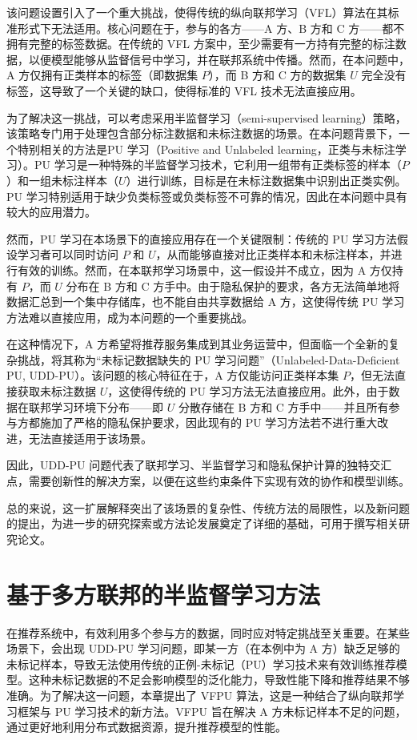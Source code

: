 该问题设置引入了一个重大挑战，使得传统的纵向联邦学习（VFL）算法在其标准形式下无法适用。核心问题在于，参与的各方——A 方、B 方和 C 方——都不拥有完整的标签数据。在传统的 VFL 方案中，至少需要有一方持有完整的标注数据，以便模型能够从监督信号中学习，并在联邦系统中传播。然而，在本问题中，A 方仅拥有正类样本的标签（即数据集 $ P $），而 B 方和 C 方的数据集 $ U $ 完全没有标签，这导致了一个关键的缺口，使得标准的 VFL 技术无法直接应用。

为了解决这一挑战，可以考虑采用半监督学习（semi-supervised learning）策略，该策略专门用于处理包含部分标注数据和未标注数据的场景。在本问题背景下，一个特别相关的方法是PU 学习（Positive and Unlabeled learning，正类与未标注学习）。PU 学习是一种特殊的半监督学习技术，它利用一组带有正类标签的样本（$ P $）和一组未标注样本（$ U $）进行训练，目标是在未标注数据集中识别出正类实例。PU 学习特别适用于缺少负类标签或负类标签不可靠的情况，因此在本问题中具有较大的应用潜力。

然而，PU 学习在本场景下的直接应用存在一个关键限制：传统的 PU 学习方法假设学习者可以同时访问 $ P $ 和 $ U $，从而能够直接对比正类样本和未标注样本，并进行有效的训练。然而，在本联邦学习场景中，这一假设并不成立，因为 A 方仅持有 $ P $，而 $ U $ 分布在 B 方和 C 方手中。由于隐私保护的要求，各方无法简单地将数据汇总到一个集中存储库，也不能自由共享数据给 A 方，这使得传统 PU 学习方法难以直接应用，成为本问题的一个重要挑战。

在这种情况下，A 方希望将推荐服务集成到其业务运营中，但面临一个全新的复杂挑战，将其称为“未标记数据缺失的 PU 学习问题”（Unlabeled-Data-Deficient PU, UDD-PU）。该问题的核心特征在于，A 方仅能访问正类样本集 $ P $，但无法直接获取未标注数据 $ U $，这使得传统的 PU 学习方法无法直接应用。此外，由于数据在联邦学习环境下分布——即 $ U $ 分散存储在 B 方和 C 方手中——并且所有参与方都施加了严格的隐私保护要求，因此现有的 PU 学习方法若不进行重大改进，无法直接适用于该场景。

因此，UDD-PU 问题代表了联邦学习、半监督学习和隐私保护计算的独特交汇点，需要创新性的解决方案，以便在这些约束条件下实现有效的协作和模型训练。

总的来说，这一扩展解释突出了该场景的复杂性、传统方法的局限性，以及新问题的提出，为进一步的研究探索或方法论发展奠定了详细的基础，可用于撰写相关研究论文。


\section{基于多方联邦的半监督学习方法}
在推荐系统中，有效利用多个参与方的数据，同时应对特定挑战至关重要。在某些场景下，会出现 UDD-PU 学习问题，即某一方（在本例中为 A 方）缺乏足够的未标记样本，导致无法使用传统的正例-未标记（PU）学习技术来有效训练推荐模型。这种未标记数据的不足会影响模型的泛化能力，导致性能下降和推荐结果不够准确。为了解决这一问题，本章提出了 VFPU 算法，这是一种结合了纵向联邦学习框架与 PU 学习技术的新方法。VFPU 旨在解决 A 方未标记样本不足的问题，通过更好地利用分布式数据资源，提升推荐模型的性能。

